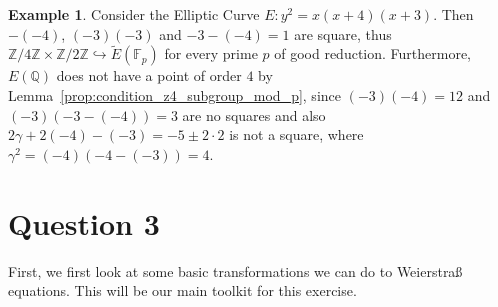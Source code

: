 \documentclass{scrartcl}
\newcommand{\Z}{\mathbb{Z}}
\newcommand{\F}{\mathbb{F}}
\newcommand{\Q}{\mathbb{Q}}
\theoremstyle{definition}
\newtheorem{example}[subsection]{Example}
\begin{document}
\begin{example}
    Consider the Elliptic Curve $E: y^2 = x(x + 4)(x + 3)$.
    Then $-(-4)$, $(-3)(-3)$ and $-3 - (-4) = 1$ are square, thus $\Z/4\Z \times \Z/2\Z \hookrightarrow \tilde{E}(\F_p)$ for every prime $p$ of good reduction.
    Furthermore, $E(\Q)$ does not have a point of order $4$ by Lemma~\ref{prop:condition_z4_subgroup_mod_p}, since $(-3)(-4) = 12$ and $(-3)(-3 - (-4)) = 3$ are no squares and also $2\gamma + 2(-4) - (-3) = -5 \pm 2 \cdot 2$ is not a square, where $\gamma^2 = (-4)(-4 - (-3)) = 4$.
\end{example}

\section{Question 3}
First, we first look at some basic transformations we can do to Weierstraß equations.
This will be our main toolkit for this exercise.
\end{document}
